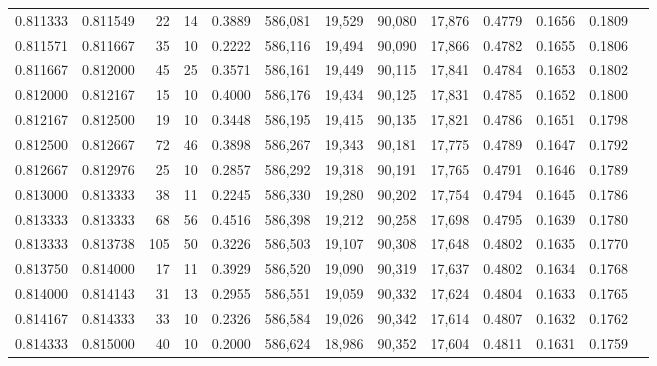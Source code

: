 \begin{tabular}{rrrrrrrrrrrrr}
0.811333 & 0.811549 &    22 &  14 &                                     0.3889 & 586,081 &  19,529 &  90,080 &  17,876 & 0.4779 & 0.1656 & 0.1809 \\
0.811571 & 0.811667 &    35 &  10 &                                     0.2222 & 586,116 &  19,494 &  90,090 &  17,866 & 0.4782 & 0.1655 & 0.1806 \\
0.811667 & 0.812000 &    45 &  25 &                                     0.3571 & 586,161 &  19,449 &  90,115 &  17,841 & 0.4784 & 0.1653 & 0.1802 \\
0.812000 & 0.812167 &    15 &  10 &                                     0.4000 & 586,176 &  19,434 &  90,125 &  17,831 & 0.4785 & 0.1652 & 0.1800 \\
0.812167 & 0.812500 &    19 &  10 &                                     0.3448 & 586,195 &  19,415 &  90,135 &  17,821 & 0.4786 & 0.1651 & 0.1798 \\
0.812500 & 0.812667 &    72 &  46 &                                     0.3898 & 586,267 &  19,343 &  90,181 &  17,775 & 0.4789 & 0.1647 & 0.1792 \\
0.812667 & 0.812976 &    25 &  10 &                                     0.2857 & 586,292 &  19,318 &  90,191 &  17,765 & 0.4791 & 0.1646 & 0.1789 \\
0.813000 & 0.813333 &    38 &  11 &                                     0.2245 & 586,330 &  19,280 &  90,202 &  17,754 & 0.4794 & 0.1645 & 0.1786 \\
0.813333 & 0.813333 &    68 &  56 &                                     0.4516 & 586,398 &  19,212 &  90,258 &  17,698 & 0.4795 & 0.1639 & 0.1780 \\
0.813333 & 0.813738 &   105 &  50 &                                     0.3226 & 586,503 &  19,107 &  90,308 &  17,648 & 0.4802 & 0.1635 & 0.1770 \\
0.813750 & 0.814000 &    17 &  11 &                                     0.3929 & 586,520 &  19,090 &  90,319 &  17,637 & 0.4802 & 0.1634 & 0.1768 \\
0.814000 & 0.814143 &    31 &  13 &                                     0.2955 & 586,551 &  19,059 &  90,332 &  17,624 & 0.4804 & 0.1633 & 0.1765 \\
0.814167 & 0.814333 &    33 &  10 &                                     0.2326 & 586,584 &  19,026 &  90,342 &  17,614 & 0.4807 & 0.1632 & 0.1762 \\
0.814333 & 0.815000 &    40 &  10 &                                     0.2000 & 586,624 &  18,986 &  90,352 &  17,604 & 0.4811 & 0.1631 & 0.1759 \\

\end{tabular}
